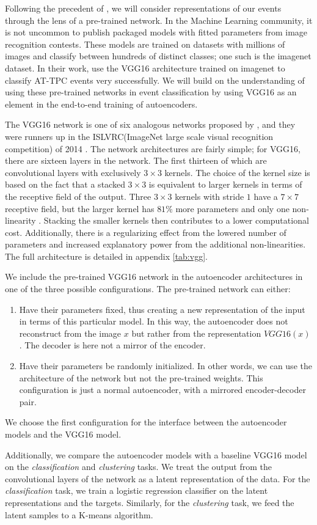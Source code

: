 Following the precedent of \citet{Kuchera2019}, we will consider representations of our events through the lens of a pre-trained network. In the Machine Learning community, it is not uncommon to publish packaged models with fitted parameters from image recognition contests. These models are trained on datasets with millions of images and classify between hundreds of distinct classes; one such is the imagenet dataset. In their work, \citet{Kuchera2019} use the VGG16 architecture trained on imagenet to classify AT-TPC events very successfully.  We will build on the understanding of using these pre-trained networks in event classification by using VGG16 as an element in the end-to-end training of autoencoders. 

The VGG16 network is one of six analogous networks proposed by \citet{Simonyan2014}, and they were runners up in the ISLVRC(ImageNet large scale visual recognition competition) of 2014 \cite{Russakovsky2015}. The network architectures are fairly simple; for VGG16, there are sixteen layers in the network. The first thirteen of which are convolutional layers with exclusively $3 \times 3$ kernels. The choice of the kernel size is based on the fact that a stacked $3 \times 3$ is equivalent to larger kernels in terms of the receptive field of the output. Three $3 \times 3$ kernels with stride $1$ have a $7 \times 7$ receptive field, but the larger kernel has $81\%$ more parameters and only one non-linearity \cite{Simonyan2014}. Stacking the smaller kernels then contributes to a lower computational cost. Additionally, there is a regularizing effect from the lowered number of parameters and increased explanatory power from the additional non-linearities. The full architecture is detailed in appendix \ref{tab:vgg}.

We include the pre-trained VGG16 network in the autoencoder architectures in one of the three possible configurations. The pre-trained network can either:

\begin{enumerate}
\item Have their parameters fixed, thus creating a new representation of the input in terms of this particular model. In this way, the autoencoder does not reconstruct from the image $x$ but rather from the representation $VGG16(x)$. The decoder is here not a mirror of the encoder.
\item Have their parameters be randomly initialized. In other words, we can use the architecture of the network but not the pre-trained weights. This configuration is just a normal autoencoder, with a mirrored encoder-decoder pair. 
\end{enumerate}

We choose the first configuration for the interface between the autoencoder models and the VGG16 model. 

Additionally, we compare the autoencoder models with a baseline VGG16 model on the \textit{classification} and \textit{clustering} tasks. We treat the output from the convolutional layers of the network as a latent representation of the data. For the \textit{classification} task, we train a logistic regression classifier on the latent representations and the targets. Similarly, for the \textit{clustering} task, we feed the latent samples to a K-means algorithm. 